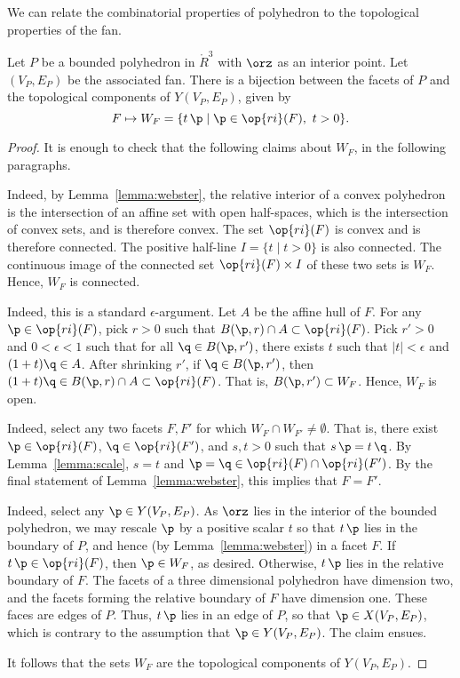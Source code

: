 We can relate the combinatorial properties of polyhedron to the topological
properties of the fan.

\begin{lemma}[]\cutrate{}\label{lemma:WF} 
Let $P$ be a bounded polyhedron in $\ring{R}^3$ with $\orz$ as an
interior point.  Let $(V_P,E_P)$ be the associated fan.  There is a
bijection between the facets of $P$ and the topological components
of $Y(V_P,E_P)$, given by
\[ 
F \mapsto W_F = \{t\, \p \mid \p\in \op{ri}(F),~t >0\}.
\] 
\end{lemma}
%

\begin{proof} It is enough to check that the following claims
about $W_F$,  in the following paragraphs.

 Indeed, by Lemma~\ref{lemma:webster},
the relative interior of a convex polyhedron is the intersection of
an affine set with open half-spaces, which is the intersection of
convex sets, and is therefore convex. The set $\op{ri}(F)$ is
convex and is therefore connected.  The positive half-line $I=\{t\mid t>0\}$
is also connected.  The continuous image of the connected set
$\op{ri}(F)\times I$ of these two sets is $W_F$.  Hence, $W_F$ is
connected.

  Indeed, this is a standard
$\epsilon$-argument.  Let $A$ be the affine hull of $F$.  For any
$\p\in \op{ri}(F)$, pick $r>0$ such that $B(\p,r)\cap A\subset
\op{ri}(F)$.  Pick $r'>0$ and $0<\epsilon<1$ such that for all
$\q\in B(\p,r')$, there exists $t$ such that $|t|<\epsilon$ and
$(1+t)\q\in A$.  After shrinking $r'$, if $\q\in B(\p,r')$, then
$(1+t)\q \in B(\p,r)\cap A \subset \op{ri}(F)$.  That is,
$B(\p,r')\subset W_F$.  Hence, $W_F$ is open.

  Indeed, select any two facets $F,F'$ for
which $W_F\cap W_{F'}\ne \emptyset$.  That is, there exist $\p\in
\op{ri}(F)$, $\q\in \op{ri}(F')$, and $s,t>0$ such that $s\, \p = t\,
\q$.  By Lemma~\ref{lemma:scale}, $s=t$ and $\p=\q\in \op{ri}(F)\cap
\op{ri}(F')$.  By the final statement of Lemma~\ref{lemma:webster},
this implies that $F=F'$.

  Indeed,
select any $\p\in Y(V_P,E_P)$.  As $\orz$ lies in the interior of
the bounded polyhedron, we may rescale $\p$ by a positive scalar $t$
so that $t\, \p$ lies in the boundary of $P$, and hence (by
Lemma~\ref{lemma:webster}) in a facet $F$.  If $t\, \p \in
\op{ri}(F)$, then $\p\in W_F$, as desired.  Otherwise, $t\, \p$ lies
in the relative boundary of $F$.  The facets of a three dimensional
polyhedron have dimension two, and the facets forming the relative
boundary of $F$ have dimension one.  These faces are edges of $P$.
Thus, $t\, \p$ lies in an edge of $P$, so that $\p\in X(V_P,E_P)$,
which is contrary to the assumption that $\p\in Y(V_P,E_P)$.  The
claim ensues.

It follows that the sets $W_F$ are the
topological components of $Y(V_P,E_P)$.
\end{proof}
%


